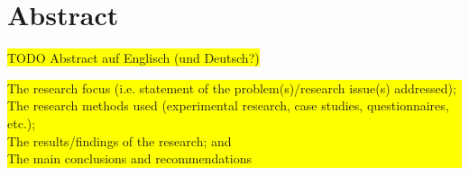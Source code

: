 \section*{Abstract}

\colorbox{yellow}{TODO Abstract auf Englisch (und Deutsch?)}

\colorbox{yellow}{\parbox{\textwidth}{
The research focus (i.e. statement of the problem(s)/research issue(s) addressed);\\
The research methods used (experimental research, case studies, questionnaires, etc.);\\
The results/findings of the research; and\\
The main conclusions and recommendations
}}

